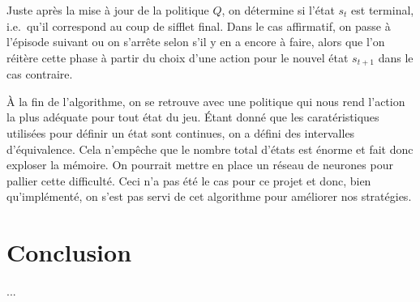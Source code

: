 \documentclass[12pt,a4paper]{article}
\begin{document}
Juste apr\`es la mise \`a jour de la politique $Q$, on d\'etermine si l'\'etat 
$s_t$ est terminal, i.e.\ qu'il correspond au coup de sifflet final. Dans le 
cas affirmatif, on passe \`a l'\'episode suivant ou on s'arr\^ete selon s'il y 
en a encore \`a faire, alors que l'on r\'eit\`ere cette phase \`a partir du 
choix d'une action pour le nouvel \'etat $s_{t+1}$ dans le cas contraire.

\`A la fin de l'algorithme, on se retrouve avec une politique qui nous rend 
l'action la plus ad\'equate pour tout \'etat du jeu. \'Etant donn\'e que les 
carat\'eristiques utilis\'ees pour d\'efinir un \'etat sont continues, 
on a d\'efini des intervalles d'\'equivalence. Cela n'emp\^eche que le nombre 
total d'\'etats est \'enorme et fait donc exploser la m\'emoire. On pourrait 
mettre en place un r\'eseau de neurones pour pallier cette difficult\'e. Ceci 
n'a pas \'et\'e le cas pour ce projet et donc, bien qu'impl\'ement\'e, on 
s'est pas servi de cet algorithme pour am\'eliorer nos strat\'egies. 

\newpage

\part*{Conclusion}
...
\end{document}
